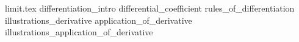 

\pagebreak
{limit.tex}
{differentiation_intro}
{differential_coefficient}
{rules_of_differentiation}
\pagebreak
{illustrations_derivative}
\pagebreak
{application_of_derivative}
\pagebreak
{illustrations_application_of_derivative}









